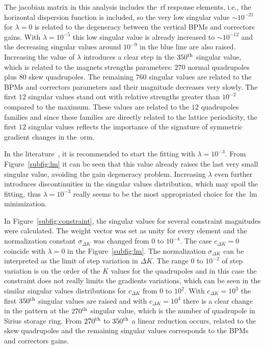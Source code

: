 The jacobian matrix in this analysis includes the~\gls{rf} response elements, i.e., the horizontal dispersion function is included, so the very low singular value $\sim10^{-21}$ for $\lambda = 0$ is related to the degeneracy between the vertical BPMs and correctors gains. With $\lambda = 10^{-5}$ this low singular value is already increased to $\sim10^{-12}$ and the decreasing singular values around $10^{-9}$ in the blue line are also raised. Increasing the value of $\lambda$ introduces a clear step in the $350\textsuperscript{th}$ singular value, which is related to the magnets strengths parameters: $270$ normal quadrupoles plus $80$ skew quadrupoles. The remaining $760$ singular values are related to the BPMs and correctors parameters and their magnitude decreases very slowly. The first $12$ singular values stand out with relative strengths greater than $10^{-2}$ compared to the maximum. These values are related to the $12$ quadrupoles families and since these families are directly related to the lattice periodicity, the first $12$ singular values reflects the importance of the signature of symmetric gradient changes in the~\gls{orm}. 

In the literature~\cite{icfa_huang, huang2013}, it is recommended to start the fitting with $\lambda = 10^{-3}$. From Figure~\ref{subfig:lm} it can be seen that this value already raises the last very small singular value, avoiding the gain degeneracy problem. Increasing $\lambda$ even further introduces discontinuities in the singular values distribution, which may spoil the fitting, thus $\lambda = 10^{-3}$ really seems to be the most appropriated choice for the~\gls{lm} minimization.

In Figure~\ref{subfig:constraint}, the singular values for several constraint magnitudes were calculated. The weight vector was set as unity for every element and the normalization constant $\sigma_{\Delta K}$ was changed from $0$ to $10^{-4}$. The case $c_{\Delta K} = 0$ coincide with $\lambda = 0$ in the Figure~\ref{subfig:lm}. The normalization $\sigma_{\Delta K}$ can be interpreted as the limit of step variation in $\Delta K$. The range $0$ to $10^{-2}$ of step variation is on the order of the $K$ values for the quadrupoles and in this case the constraint does not really limits the gradients variations, which can be seen in the similar singular values distributions for $c_{\Delta K}$ from $0$ to $10^{2}$. With $c_{\Delta K}=10^{3}$ the first $350\textsuperscript{th}$ singular values are raised and with $c_{\Delta K}=10^{4}$ there is a clear change in the pattern at the $270\textsuperscript{th}$ singular value, which is the number of quadrupole in Sirius storage ring. From $270\textsuperscript{th}$ to $350\textsuperscript{th}$ a linear reduction occurs, related to the skew quadrupoles and the remaining singular values corresponds to the BPMs and correctors gains. 

